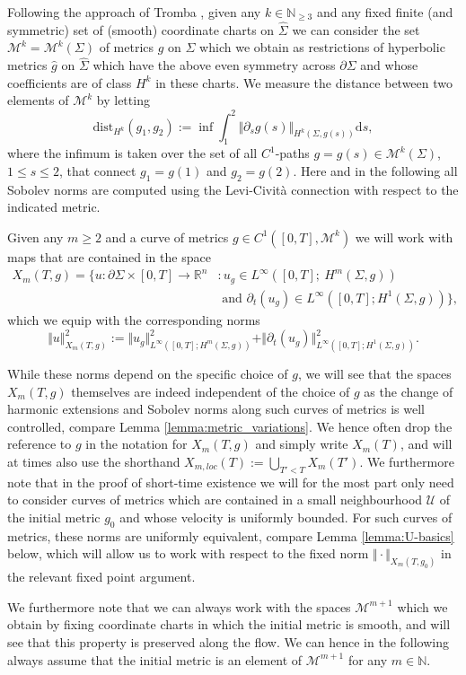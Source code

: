 \documentclass[10pt,reqno]{amsart}
\theoremstyle{plain}
\theoremstyle{definition}
\numberwithin{equation}{section}
\newcommand{\Si}{\Sigma}
\newcommand{\R}{\ensuremath{{\mathbb R}}}
\newcommand{\N}{\ensuremath{{\mathbb N}}}
\newcommand{\norm}[1]{\Vert#1\Vert}
\newcommand{\beq}{\begin{equation}}
\newcommand{\eeq}{\end{equation}}
\newcommand{\beqs}{\begin{equation*}}
\newcommand{\eeqs}{\end{equation*}}
\newcommand{\beqa}{\begin{equation}\begin{aligned}}
\newcommand{\eeqa}{\end{aligned}\end{equation}}
\newcommand{\dd}{\mathrm{d}} %
\newcommand{\dist}{\text{dist}}
\newcommand{\pSi}{{\partial \Sigma}}
\newcommand{\MM}{\mathcal{M}} %
\newcommand{\UU}{{\mathcal U}}
\newcommand{\p}{\partial} %
\begin{document}
Following the approach of Tromba \cite{Tromba}, given any $k\in \N_{\ge 3}$ and any fixed finite (and symmetric) set of (smooth) coordinate charts on $\hat\Si$ we can consider the set  $\MM^{k}=\MM^{k}(\Si)$ of metrics $g$ on $\Si$ which we obtain as restrictions of hyperbolic metrics $\hat g$ on $\hat\Si$ which have the above even symmetry across $\pSi$ and whose coefficients are of class $H^{k}$ in these charts. We measure the distance between two elements of $\MM^{k}$ by letting
\beqs
    \dist_{H^{k}}(g_1,g_2):=\inf\int_1^2\norm{\p_s g(s)}_{H^{k}(\Si,g(s))}\dd s,
\eeqs
where the infimum is taken over the set of all $C^1$-paths $g=g(s)\in\MM^{k}(\Si)$, $1\le s\le 2$, that connect $g_1=g(1)$ and $g_2=g(2)$. Here and in the following all Sobolev norms are computed using the Levi-Civit\`a connection with respect to the indicated metric. 

Given any $m\geq 2$ and a curve of metrics $g\in C^1([0,T],\MM^{k})$ we will work with maps that are contained in the space 
\beqa\label{def:Xm}
	X_m(T,g) = \{u:\pSi\times [0,T]\to \R^n& :u_{g} \in L^\infty ([0,T]; \ H^m(\Si,g)) \\&  \text{ and } \p_t (u_{g})\in 
     L^\infty ([0,T]; H^1(\Si,g)) \},
\eeqa
which we equip with the corresponding norms 
\beq\label{def:norm_Xm}
    \norm{u}_{X_m(T,g)}^2 := \norm{u_{g}}_{L^\infty([0,T];H^m(\Si,g))}^2 + \norm{\p_t (u_{g})}_{L^\infty([0,T]; H^1(\Si,g))}^2.
\eeq

While these norms depend on the specific choice of $g$, we will see that the spaces $X_m(T,g)$ themselves are indeed independent of the choice of $g$ as the change of harmonic extensions and Sobolev norms along such curves of metrics is well controlled, compare Lemma \ref{lemma:metric_variations}. We hence often drop the reference to $g$ in the notation for $X_m(T,g)$ and simply write $X_m(T)$, and will at times also use the shorthand $X_{m,loc}(T):= \bigcup_{T'<T} X_{m}(T')$. We furthermore note that in the proof of short-time existence we will for the most part only need to consider curves of metrics which are contained in a small neighbourhood $\UU$ of the initial metric $g_0$ and whose velocity is uniformly bounded. For such curves of metrics, these norms are uniformly equivalent, compare Lemma \ref{lemma:U-basics} below, which will allow us to work with respect to the fixed norm $\norm{\cdot}_{X_m(T,g_0)}$ in the relevant fixed point argument.

We furthermore note that we can always work with the spaces $\MM^{m+1}$ which we obtain by fixing coordinate charts in which the initial metric is smooth, and will see that this property is preserved along the flow. We can hence in the following always assume that the initial metric is an element of $\MM^{m+1}$ for any $m\in \N$.
\end{document}
